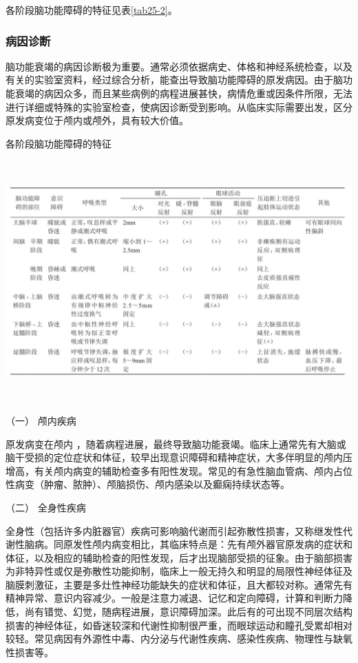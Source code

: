 各阶段脑功能障碍的特征见表\ref{tab25-2}。

\subsubsection{病因诊断}

脑功能衰竭的病因诊断极为重要。通常必须依据病史、体格和神经系统检查，以及有关的实验室资料，经过综合分析，能查出导致脑功能障碍的原发病因。由于脑功能衰竭的病因众多，而且某些病例的病程进展甚快，病情危重或因条件所限，无法进行详细或特殊的实验室检查，使病因诊断受到影响。从临床实际需要出发，区分原发病变位于颅内或颅外，具有较大价值。

\begin{table}[htbp]
\centering
\caption{各阶段脑功能障碍的特征}
\label{tab25-2}
\includegraphics[width=6.69792in,height=3.64583in]{./images/Image00092.jpg}
\end{table}

\hypertarget{text00067.htmlux5cux23CHP3-1-2-3-1}{}
（一） 颅内疾病

原发病变在颅内
，随着病程进展，最终导致脑功能衰竭。临床上通常先有大脑或脑干受损的定位症状和体征，较早出现意识障碍和精神症状，大多伴明显的颅内压增高，有关颅内病变的辅助检查多有阳性发现。常见的有急性脑血管病、颅内占位性病变（肿瘤、脓肿）、颅脑损伤、颅内感染以及癫痫持续状态等。

\hypertarget{text00067.htmlux5cux23CHP3-1-2-3-2}{}
（二） 全身性疾病

全身性（包括许多内脏器官）疾病可影响脑代谢而引起弥散性损害，又称继发性代谢性脑病。同原发性颅内病变相比，其临床特点是：先有颅外器官原发病的症状和体征，以及相应的辅助检查的阳性发现，后才出现脑部受损的征象。由于脑部损害为非特异性或仅是弥散性功能抑制，临床上一般无持久和明显的局限性神经体征及脑膜刺激征，主要是多灶性神经功能缺失的症状和体征，且大都较对称。通常先有精神异常、意识内容减少。一般是注意力减退、记忆和定向障碍，计算和判断力降低，尚有错觉、幻觉，随病程进展，意识障碍加深。此后有的可出现不同层次结构损害的神经体征，如昏迷较深和代谢性抑制很严重，而眼球运动和瞳孔受累却相对较轻。常见病因有外源性中毒、内分泌与代谢性疾病、感染性疾病、物理性与缺氧性损害等。

